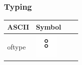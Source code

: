 \subsubsection{Typing}

\begin{center}
    \begin{tabular}{ | l | l | l | p{5cm} |}
    \hline
	ASCII & Symbol \\ \hline
	oftype & \includegraphics[]{img/reference/ref_03_offtype_symbol.png} \\ \hline
    \end{tabular}
\end{center}

